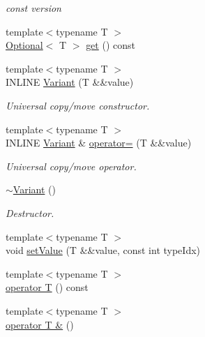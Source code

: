 \begin{DoxyCompactItemize}
\begin{DoxyCompactList}\small\item\em const version \end{DoxyCompactList}\item 
{\footnotesize template$<$typename T $>$ }\\\hyperlink{classOptional}{Optional}$<$ T $>$ \hyperlink{classVariant_a478e263679709c8fd398d2bd27a03e1f}{get} () const
\item 
\hypertarget{classVariant_a0cebeee0963fc33019e2be3140f56a1c}{}\label{classVariant_a0cebeee0963fc33019e2be3140f56a1c} 
{\footnotesize template$<$typename T $>$ }\\I\+N\+L\+I\+NE \hyperlink{classVariant_a0cebeee0963fc33019e2be3140f56a1c}{Variant} (T \&\&value)
\begin{DoxyCompactList}\small\item\em Universal copy/move constructor. \end{DoxyCompactList}\item 
\hypertarget{classVariant_a1642eb4657f43ce8c460d7d4a4e452e5}{}\label{classVariant_a1642eb4657f43ce8c460d7d4a4e452e5} 
{\footnotesize template$<$typename T $>$ }\\I\+N\+L\+I\+NE \hyperlink{classVariant}{Variant} \& \hyperlink{classVariant_a1642eb4657f43ce8c460d7d4a4e452e5}{operator=} (T \&\&value)
\begin{DoxyCompactList}\small\item\em Universal copy/move operator. \end{DoxyCompactList}\item 
\hyperlink{classVariant_af2c39ddb0ac48d6e3ec1eac09c08478d}{$\sim$\+Variant} ()
\begin{DoxyCompactList}\small\item\em Destructor. \end{DoxyCompactList}\item 
{\footnotesize template$<$typename T $>$ }\\void \hyperlink{classVariant_ab2433a4d048f4809d599986713c5a3d8}{set\+Value} (T \&\&value, const int type\+Idx)
\item 
{\footnotesize template$<$typename T $>$ }\\\hyperlink{classVariant_a939142e02efadd71477177b6c4c67b57}{operator T} () const
\item 
\hypertarget{classVariant_a4a9d805a2f8a07ee673d8db8a9f7a524}{}\label{classVariant_a4a9d805a2f8a07ee673d8db8a9f7a524} 
{\footnotesize template$<$typename T $>$ }\\\hyperlink{classVariant_a4a9d805a2f8a07ee673d8db8a9f7a524}{operator T \&} ()

\end{DoxyCompactItemize}
